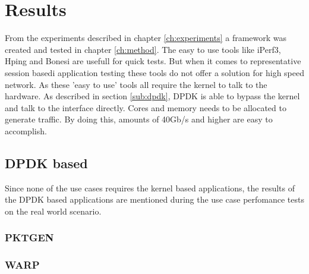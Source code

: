\chapter{Results}\label{ch:results}

From the experiments described in chapter \ref{ch:experiments} a framework was created and tested in chapter \ref{ch:method}. 
The easy to use tools like iPerf3, Hping and Bonesi are usefull for quick tests. But when it comes to representative session basedi application testing these tools do not offer a solution for high speed network. 
As these 'easy to use' tools all require the kernel to talk to the hardware. As described in section \ref{sub:dpdk}, DPDK is able to bypass the kernel and talk to the interface directly. Cores and memory needs to be allocated to generate traffic. By doing this, amounts of 40Gb/s and higher are easy to accomplish.  

\section{DPDK based}
Since none of the use cases requires the kernel based applications, the results of the DPDK based applications are mentioned during the use case perfomance tests on the real world scenario.  

\subsection{PKTGEN}


\subsection{WARP}



